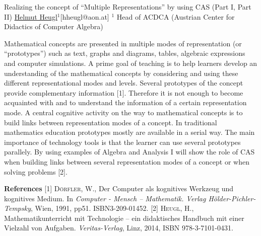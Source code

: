 


\begin{abstract_online}{Realizing the concept of “Multiple Representations” by using CAS (Part I, Part II)}{%
        \underline{Helmut Heugl}$^{1}$}{[hheugl@aon.at]
        }{%
        $^1$ Head of ACDCA (Austrian Center for Didactics of Computer Algebra)}
    
Mathematical concepts are presented in multiple modes of representation (or “prototypes”) such as text, graphs and diagrams, tables, algebraic expressions and computer simulations.  A prime goal of teaching is to help learners develop an understanding of the mathematical concepts by considering and using these different representational modes and levels. Several prototypes of the concept provide complementary information [1]. 
Therefore it is not enough to become acquainted with and to understand the information of a certain representation mode. A central cognitive activity on the way to mathematical concepts is to build links between representation modes of a concept. In traditional mathematics education prototypes mostly are available in a serial way.  The main importance of technology tools is that the learner can use several prototypes parallely.
By using examples of Algebra and Analysis I will show the role of CAS when building links between several representation modes of a concept or when solving problems [2].




\textbf{References} \newline{}
[1] \textsc{Dörfler, W.}, Der Computer als kognitives Werkzeug und kognitives Medium.  In \emph{Computer - Mensch – Mathematik. Verlag Hölder-Pichler-Tempsky}, Wien, 1991, pp51. ISBN3-209-01452. \newline{}
[2] \textsc{Heugl, H.}, Mathematikunterricht mit Technologie – ein didaktisches Handbuch mit einer Vielzahl von Aufgaben. \emph{Veritas-Verlag}, Linz, 2014, ISBN 978-3-7101-0431. \newline{}

\end{abstract_online}
    